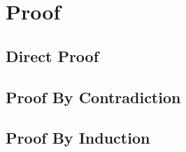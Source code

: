\section{Proof}

\subsection{Direct Proof}
\subsection{Proof By Contradiction}
\subsection{Proof By Induction}


\lipsum
